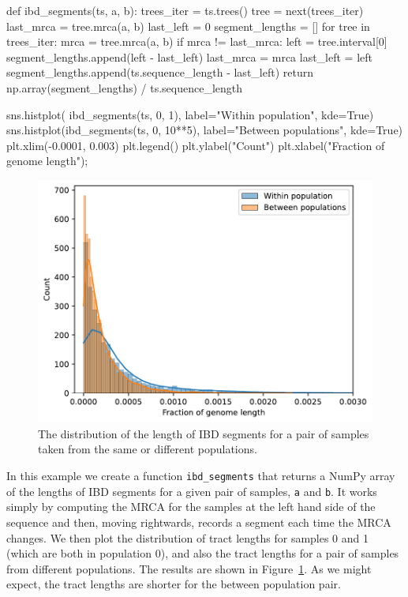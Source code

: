 \documentclass[graybox]{svmult}
\begin{document}
\begin{pythoncode}
def ibd_segments(ts, a, b):
    trees_iter = ts.trees()
    tree = next(trees_iter)
    last_mrca = tree.mrca(a, b)
    last_left = 0
    segment_lengths = []
    for tree in trees_iter:
        mrca = tree.mrca(a, b)
        if mrca != last_mrca:
            left = tree.interval[0]
            segment_lengths.append(left - last_left)
            last_mrca = mrca
            last_left = left
    segment_lengths.append(ts.sequence_length - last_left)
    return np.array(segment_lengths) / ts.sequence_length

sns.histplot(
    ibd_segments(ts, 0, 1), label="Within population", kde=True)
sns.histplot(ibd_segments(ts, 0, 10**5),
    label="Between populations", kde=True)
plt.xlim(-0.0001, 0.003)
plt.legend()
plt.ylabel("Count")
plt.xlabel("Fraction of genome length");
\end{pythoncode}

\begin{figure}
\begin{center}
\includegraphics[width=\textwidth]{images/plot_12.pdf}
\end{center}
\caption{\label{fig:ibd_segments} The distribution of the length of IBD
segments for a pair of samples taken from the same or different populations.}
\end{figure}

In this example we create a function \texttt{ibd\_segments} that returns
a NumPy array of the lengths of IBD segments for a given pair of
samples, \texttt{a} and \texttt{b}. It works simply by computing the
MRCA for the samples at the left hand side of the sequence and then,
moving rightwards, records a segment each time the MRCA changes. We then
plot the distribution of tract lengths for samples 0 and 1 (which are
both in population 0), and also the tract lengths for a pair of
samples from different populations. The results are shown in
Figure~\ref{fig:ibd_segments}. As we might expect, the tract
lengths are shorter for the between population pair.
\end{document}
